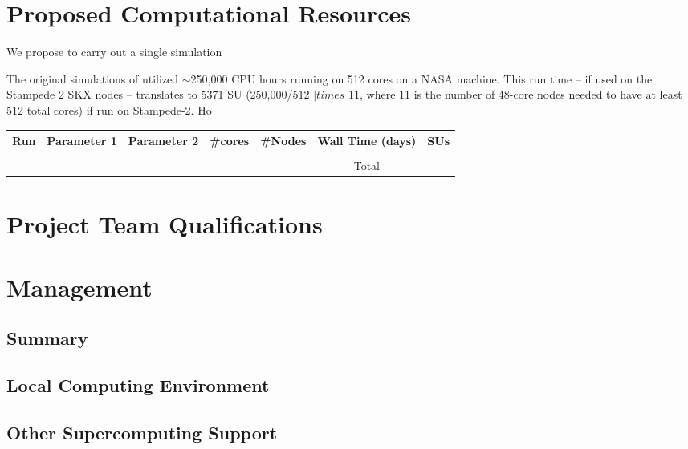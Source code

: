 \documentclass[12pt]{article} %
\begin{document}
\section{Proposed Computational Resources}

We propose to carry out a single simulation


The original simulations of \cite{Wise2012a} utilized $\sim$250,000 CPU hours running on 512 cores on a NASA machine. This run time -- if used on the Stampede 2 SKX nodes -- translates to 5371 SU (250,000/512 $|times$ 11, where 11 is the number of 48-core nodes needed to have at least 512 total cores) if run on Stampede-2. Ho

\begin{tabular}{c|c|c|c|c|c|c}
\hline
\hline
 Run & Parameter 1 & Parameter 2 & \#cores & \#Nodes & Wall Time (days) & \textbf{SUs} \\
 \hline
     & & & & & & \\
 \hline 
 & & & & & Total &
\end{tabular}


\section{Project Team Qualifications}

\section{Management} 
\subsection{Summary}
\subsection{Local Computing Environment}
\subsection{Other Supercomputing Support}


\def\bibfont{\footnotesize}

\end{document}
